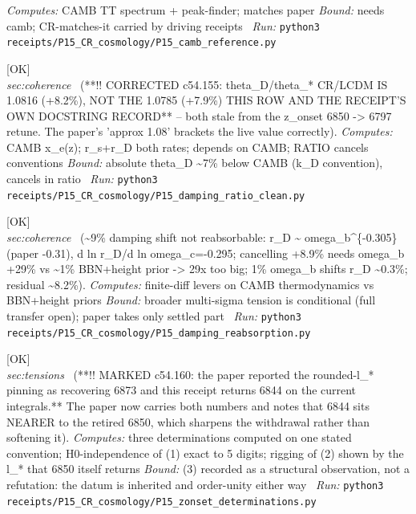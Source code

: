 \begin{description}
\emph{Computes:} CAMB TT spectrum + peak-finder; matches paper
 \emph{Bound:} needs camb; CR-matches-it carried by driving receipts
\ \emph{Run:} \texttt{python3 receipts/P15\_CR\_cosmology/P15\_camb\_reference.py}
\item[\label{rcpt:P15_damping_ratio_clean}\texttt{P15\_damping\_ratio\_clean}]\hfill\textsf{[OK]}\\
\textit{sec:coherence} \ (**!! CORRECTED c54.155: theta\_D/theta\_* CR/LCDM IS 1.0816 (+8.2\%), NOT THE 1.0785 (+7.9\%) THIS ROW AND THE RECEIPT'S OWN DOCSTRING RECORD** -- both stale from the z\_onset 6850 -> 6797 retune. The paper's 'approx 1.08' brackets the live value correctly). 
\emph{Computes:} CAMB x\_e(z); r\_s+r\_D both rates; depends on CAMB; RATIO cancels conventions
 \emph{Bound:} absolute theta\_D \textasciitilde{}7\% below CAMB (k\_D convention), cancels in ratio
\ \emph{Run:} \texttt{python3 receipts/P15\_CR\_cosmology/P15\_damping\_ratio\_clean.py}
\item[\label{rcpt:P15_damping_reabsorption}\texttt{P15\_damping\_reabsorption}]\hfill\textsf{[OK]}\\
\textit{sec:coherence} \ (\textasciitilde{}9\% damping shift not reabsorbable: r\_D \textasciitilde{} omega\_b\textasciicircum{}\{-0.305\} (paper -0.31), d ln r\_D/d ln omega\_c=-0.295; cancelling +8.9\% needs omega\_b +29\% vs \textasciitilde{}1\% BBN+height prior -> 29x too big; 1\% omega\_b shifts r\_D \textasciitilde{}0.3\%; residual \textasciitilde{}8.2\%). 
\emph{Computes:} finite-diff levers on CAMB thermodynamics vs BBN+height priors
 \emph{Bound:} broader multi-sigma tension is conditional (full transfer open); paper takes only settled part
\ \emph{Run:} \texttt{python3 receipts/P15\_CR\_cosmology/P15\_damping\_reabsorption.py}
\item[\label{rcpt:P15_zonset_determinations}\texttt{P15\_zonset\_determinations}]\hfill\textsf{[OK]}\\
\textit{sec:tensions} \ (**!! MARKED c54.160: the paper reported the rounded-l\_* pinning as recovering 6873 and this receipt returns 6844 on the current integrals.** The paper now carries both numbers and notes that 6844 sits NEARER to the retired 6850, which sharpens the withdrawal rather than softening it). 
\emph{Computes:} three determinations computed on one stated convention; H0-independence of (1) exact to 5 digits; rigging of (2) shown by the l\_* that 6850 itself returns
 \emph{Bound:} (3) recorded as a structural observation, not a refutation: the datum is inherited and order-unity either way
\ \emph{Run:} \texttt{python3 receipts/P15\_CR\_cosmology/P15\_zonset\_determinations.py}

\end{description}
